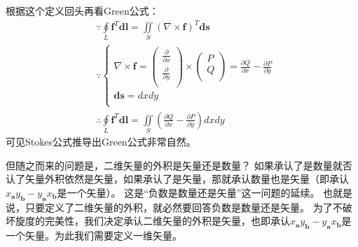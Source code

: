 根据这个定义回头再看Green公式：
\begin{align*}
&\because \oint\limits_L{\boldsymbol{f}^T\mathbf{dl}}=\iint\limits_S{\left( \nabla \times \boldsymbol{f} \right) ^T\boldsymbol{ds}} \\
&\because \begin{cases}
	\nabla \times \boldsymbol{f}=\left( \begin{array}{c}
	\frac{\partial}{\partial x}\\
	\frac{\partial}{\partial y}\\
\end{array} \right) \times \left( \begin{array}{c}
	P\\
	Q\\
\end{array} \right) =\frac{\partial Q}{\partial x}-\frac{\partial P}{\partial y}\\
	\boldsymbol{ds}=dxdy\\
\end{cases} \\
&\therefore \oint\limits_L{\boldsymbol{f}^T\mathbf{dl}}=\iint\limits_S{\left( \frac{\partial Q}{\partial x}-\frac{\partial P}{\partial y} \right) dxdy}
\end{align*}
可见Stokes公式推导出Green公式非常自然。

但随之而来的问题是，二维矢量的外积是矢量还是数量？
如果承认了是数量就否认了矢量外积依然是矢量，如果承认了是矢量，那就承认数量也是矢量（即承认$x_{\boldsymbol{a}}y_{\boldsymbol{b}}-y_{\boldsymbol{a}}x_{\boldsymbol{b}}$是一个矢量）。
这是“负数是数量还是矢量”这一问题的延续。
也就是说，只要定义了二维矢量的外积，就必然要回答负数是数量还是矢量。
为了不破坏旋度的完美性，我们决定承认二维矢量的外积是矢量，也即承认$x_{\boldsymbol{a}}y_{\boldsymbol{b}}-y_{\boldsymbol{a}}x_{\boldsymbol{b}}$是一个矢量。为此我们需要定义一维矢量。

